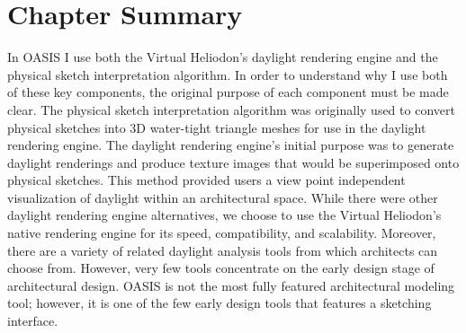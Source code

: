\section{Chapter Summary}

In OASIS I use both the Virtual Heliodon's daylight rendering engine and the physical sketch interpretation algorithm.
In order to understand why I use both of these key components, the original purpose of each component must be made clear.
The physical sketch interpretation algorithm was originally used to convert physical sketches into 3D water-tight triangle meshes for use in the daylight rendering engine.
The daylight rendering engine's initial purpose was to generate daylight renderings and produce texture images that would be superimposed onto physical sketches.
This method provided users a view point independent visualization of daylight within an architectural space.
While there were other daylight rendering engine alternatives, we choose to use the Virtual Heliodon's native rendering engine for its speed, compatibility, and scalability.
Moreover, there are a variety of related daylight analysis tools from which architects can choose from.
However, very few tools concentrate on the early design stage of architectural design.
OASIS is not the most fully featured architectural modeling tool; however, it is one of the few early design tools that features a sketching interface.
